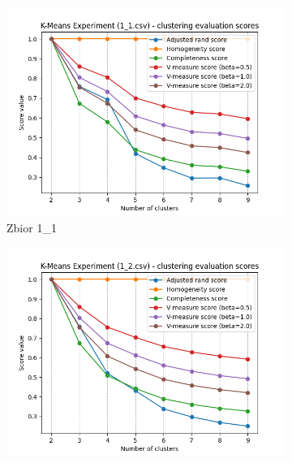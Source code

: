 \documentclass[12pt]{article}
\begin{document}

\begin{figure}[H]
    \centering
    \begin{subfigure}[b]{0.3\textwidth}
        \includegraphics[width=\linewidth]{img/exp_2/kmeans/1_1_scores.png}
        \caption{Zbior 1\_1}
    \end{subfigure}
    \hfill
    \begin{subfigure}[b]{0.3\textwidth}
        \includegraphics[width=\linewidth]{img/exp_2/kmeans/1_2_scores.png}

\end{subfigure}
\end{figure}
\end{document}
